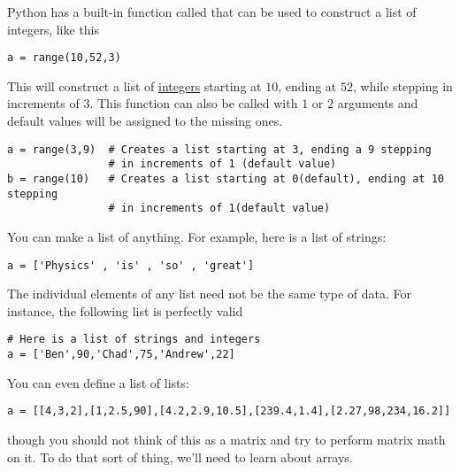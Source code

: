 \noindent Python has a built-in function called  that can be used
to construct a list of integers, like this
\begin{Verbatim}
a = range(10,52,3)
\end{Verbatim}
This will construct a list of \ul{integers} starting at $10$, ending at
$52$, while stepping in increments of $3$. This function can also be
called with $1$ or $2$ arguments and default values will be assigned
to the missing ones.
\begin{Verbatim}
a = range(3,9)  # Creates a list starting at 3, ending a 9 stepping
                # in increments of 1 (default value)
b = range(10)   # Creates a list starting at 0(default), ending at 10 stepping
                # in increments of 1(default value)
\end{Verbatim}
\noindent You can make a list of anything.  For example, here is a
list of strings:
\begin{Verbatim}
a = ['Physics' , 'is' , 'so' , 'great']
\end{Verbatim}
The individual elements of any list need not be the same type of
data.  For instance, the following list is perfectly valid
\begin{Verbatim}
# Here is a list of strings and integers
a = ['Ben',90,'Chad',75,'Andrew',22]
\end{Verbatim}
You can even define a list of lists:
\begin{Verbatim}
a = [[4,3,2],[1,2.5,90],[4.2,2.9,10.5],[239.4,1.4],[2.27,98,234,16.2]]
\end{Verbatim}
though you should not think of this as a matrix and try to perform
matrix math on it. To do that sort of thing, we'll need to learn about
arrays.
